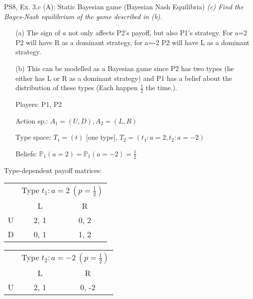 \begin{frame}{PS8, Ex. 3.c (A): Static Bayesian game (Bayesian Nash Equilibria)}
    \textit{(c) Find the Bayes-Nash equilibrium of the game described in (b).}
    \vspace{-8pt}
  \begin{multicols}{2}
    \begin{itemize}
    \item[(a)] The sign of $a$ not only affects P2's payoff, but also P1's strategy. For a=2 P2 will have R as a dominant strategy, for a=-2 P2 will have L as a dominant strategy.
    \item[(b)] This can be modelled as a Bayesian game since P2 has two types (he either has L or R as a dominant strategy) and P1 has a belief about the distribution of these types (Each happen $\frac{1}{2}$ the time.). 
        \item[Players:] P1, P2
        \item[Action sp.:] $A_1=(U,D),A_2=(L,R)$
        \item[Type space:] $T_1=(t)$ [one type], $T_2=(t_1:a=2,t_2:a=-2)$
        \item[Beliefs:] $\mathbb{P}_1(a=2)=\mathbb{P}_1(a=-2)=\frac{1}{2}$
        \vfill\null\columnbreak
    \end{itemize}
    Type-dependent payoff matrices:
    \vspace{-8pt}
    \begin{table}
        \begin{tabular}{l|c|c|}
        \multicolumn{1}{c}{} & \multicolumn{2}{c}{Type $t_1:a=2\ (p=\frac{1}{2})$} \\
        \multicolumn{1}{c}{} & \multicolumn{1}{c}{L} & \multicolumn{1}{c}{R} \\\cline{2-3}
        U & 2, 1 & 0, 2 \\\cline{2-3}
        D & 0, 1 & 1, 2 \\\cline{2-3}
      \end{tabular}
    \end{table}
    \vspace{-8pt}
    \begin{table}
      \begin{tabular}{l|c|c|}
        \multicolumn{1}{c}{} & \multicolumn{2}{c}{Type $t_2:a=-2\ (p=\frac{1}{2})$} \\
        \multicolumn{1}{c}{} & \multicolumn{1}{c}{L} & \multicolumn{1}{c}{R} \\\cline{2-3}
        U & 2, 1 & 0, -2 \\\cline{2-3}

\end{tabular}
\end{table}
\end{multicols}
\end{frame}
